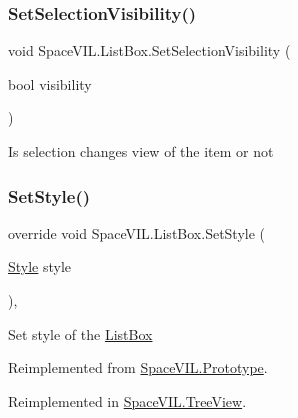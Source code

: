 \subsubsection{\texorpdfstring{Set\+Selection\+Visibility()}{SetSelectionVisibility()}}
{\footnotesize\ttfamily void Space\+V\+I\+L.\+List\+Box.\+Set\+Selection\+Visibility (\begin{DoxyParamCaption}\item[{bool}]{visibility }\end{DoxyParamCaption})\hspace{0.3cm}{\ttfamily [inline]}}



Is selection changes view of the item or not 

\mbox{\label{class_space_v_i_l_1_1_list_box_aee5cd595b70e4ca4dff5022c662373d9}} 
\subsubsection{\texorpdfstring{Set\+Style()}{SetStyle()}}
{\footnotesize\ttfamily override void Space\+V\+I\+L.\+List\+Box.\+Set\+Style (\begin{DoxyParamCaption}\item[{\mbox{\hyperlink{class_space_v_i_l_1_1_decorations_1_1_style}{Style}}}]{style }\end{DoxyParamCaption})\hspace{0.3cm}{\ttfamily [inline]}, {\ttfamily [virtual]}}



Set style of the \mbox{\hyperlink{class_space_v_i_l_1_1_list_box}{List\+Box}} 



Reimplemented from \mbox{\hyperlink{class_space_v_i_l_1_1_prototype_ae96644a6ace490afb376fb542161e541}{Space\+V\+I\+L.\+Prototype}}.



Reimplemented in \mbox{\hyperlink{class_space_v_i_l_1_1_tree_view_aac5935163cddb3e34bcef8ee112ae1dd}{Space\+V\+I\+L.\+Tree\+View}}.

\mbox{\label{class_space_v_i_l_1_1_list_box_a6e41c4678cdfd8b1a68ed0280b50cfff}} 
